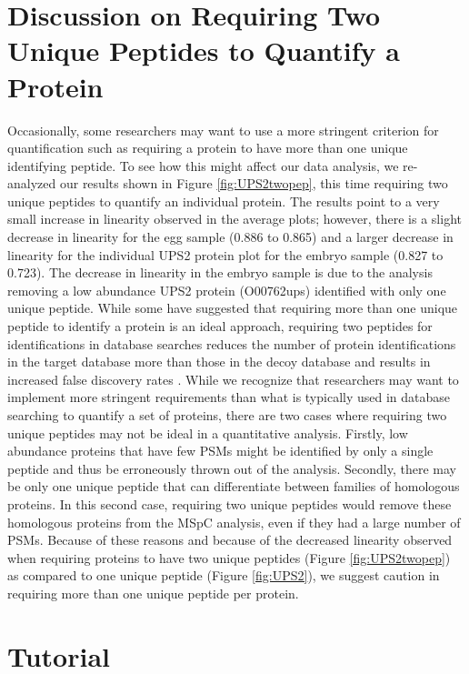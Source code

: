\section {Discussion on Requiring Two Unique Peptides to Quantify a Protein}
\label{sec:discussiontwopep}
Occasionally, some researchers may want to use a more stringent criterion for quantification such as requiring a protein to have more than one unique identifying peptide. To see how this might affect our data analysis, we re-analyzed our results shown in Figure \ref{fig:UPS2twopep}, this time requiring two unique peptides to quantify an individual protein. The results point to a very small increase in linearity observed in the average plots; however, there is a slight decrease in linearity for the egg sample (0.886 to 0.865) and a larger decrease in linearity for the individual UPS2 protein plot for the embryo sample (0.827 to 0.723). The decrease in linearity in the embryo sample is due to the analysis removing a low abundance UPS2 protein (O00762ups) identified with only one unique peptide. While some have suggested that requiring more than one unique peptide to identify a protein is an ideal approach, requiring two peptides for identifications in database searches reduces the number of protein identifications in the target database more than those in the decoy database and results in increased false discovery rates . While we recognize that researchers may want to implement more stringent requirements than what is typically used in database searching to quantify a set of proteins, there are two cases where requiring two unique peptides may not be ideal in a quantitative analysis. Firstly, low abundance proteins that have few PSMs might be identified by only a single peptide and thus be erroneously thrown out of the analysis. Secondly, there may be only one unique peptide that can differentiate between families of homologous proteins. In this second case, requiring two unique peptides would remove these homologous proteins from the MSpC analysis, even if they had a large number of PSMs. Because of these reasons and because of the decreased linearity observed when requiring proteins to have two unique peptides (Figure \ref{fig:UPS2twopep}) as compared to one unique peptide (Figure \ref{fig:UPS2}), we suggest caution in requiring more than one unique peptide per protein.

\section {Tutorial}
\label{sec:tutorial}

